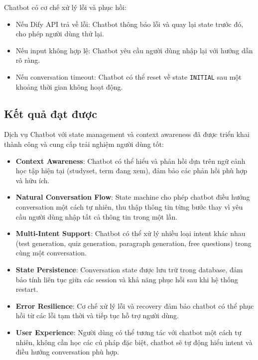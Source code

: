 \documentclass[../DoAn.tex]{subfiles}
\begin{document}
Chatbot có cơ chế xử lý lỗi và phục hồi:

\begin{itemize}
    \item Nếu Dify API trả về lỗi: Chatbot thông báo lỗi và quay lại state trước đó, cho phép người dùng thử lại.
    \item Nếu input không hợp lệ: Chatbot yêu cầu người dùng nhập lại với hướng dẫn rõ ràng.
    \item Nếu conversation timeout: Chatbot có thể reset về state \texttt{INITIAL} sau một khoảng thời gian không hoạt động.
\end{itemize}

\subsection{Kết quả đạt được}
\label{subsection:5.3.3}

Dịch vụ Chatbot với state management và context awareness đã được triển khai thành công và cung cấp trải nghiệm người dùng tốt:

\begin{itemize}
    \item \textbf{Context Awareness}: Chatbot có thể hiểu và phản hồi dựa trên ngữ cảnh học tập hiện tại (studyset, term đang xem), đảm bảo các phản hồi phù hợp và hữu ích.
    
    \item \textbf{Natural Conversation Flow}: State machine cho phép chatbot điều hướng conversation một cách tự nhiên, thu thập thông tin từng bước thay vì yêu cầu người dùng nhập tất cả thông tin trong một lần.
    
    \item \textbf{Multi-Intent Support}: Chatbot có thể xử lý nhiều loại intent khác nhau (test generation, quiz generation, paragraph generation, free questions) trong cùng một conversation.
    
    \item \textbf{State Persistence}: Conversation state được lưu trữ trong database, đảm bảo tính liên tục giữa các session và khả năng phục hồi sau khi hệ thống restart.
    
    \item \textbf{Error Resilience}: Cơ chế xử lý lỗi và recovery đảm bảo chatbot có thể phục hồi từ các lỗi tạm thời và tiếp tục hỗ trợ người dùng.
    
    \item \textbf{User Experience}: Người dùng có thể tương tác với chatbot một cách tự nhiên, không cần học các cú pháp đặc biệt, chatbot sẽ tự động hiểu intent và điều hướng conversation phù hợp.
\end{itemize}
\end{document}
